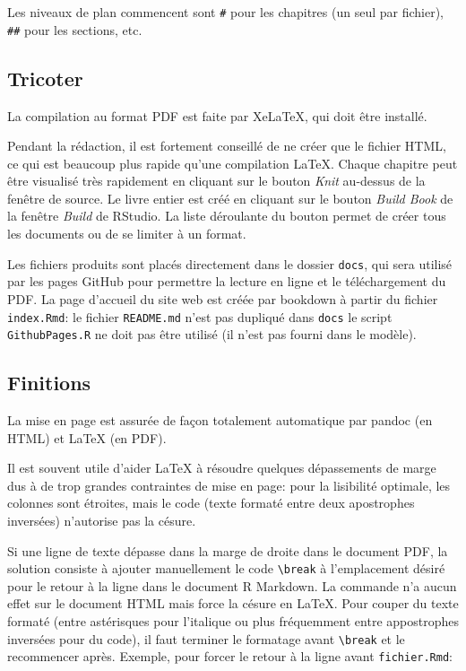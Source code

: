 \documentclass[
  11pt,
  french,
  a4paper,
  extrafontsizes,onecolumn,openright
  ]{memoir}
\begin{document}
Les niveaux de plan commencent sont \texttt{\#} pour les chapitres (un seul par fichier), \texttt{\#\#} pour les sections, etc.

\hypertarget{tricoter-1}{%
\subsection{Tricoter}\label{tricoter-1}}

La compilation au format PDF est faite par XeLaTeX, qui doit être installé.

Pendant la rédaction, il est fortement conseillé de ne créer que le fichier HTML, ce qui est beaucoup plus rapide qu'une compilation LaTeX.
Chaque chapitre peut être visualisé très rapidement en cliquant sur le bouton \emph{Knit} au-dessus de la fenêtre de source.
Le livre entier est créé en cliquant sur le bouton \emph{Build Book} de la fenêtre \emph{Build} de RStudio.
La liste déroulante du bouton permet de créer tous les documents ou de se limiter à un format.

Les fichiers produits sont placés directement dans le dossier \texttt{docs}, qui sera utilisé par les pages GitHub pour permettre la lecture en ligne et le téléchargement du PDF.
La page d'accueil du site web est créée par bookdown à partir du fichier \texttt{index.Rmd}: le fichier \texttt{README.md} n'est pas dupliqué dans \texttt{docs} le script \texttt{GithubPages.R} ne doit pas être utilisé (il n'est pas fourni dans le modèle).

\hypertarget{finitions}{%
\subsection{Finitions}\label{finitions}}

La mise en page est assurée de façon totalement automatique par pandoc (en HTML) et LaTeX (en PDF).

Il est souvent utile d'aider LaTeX à résoudre quelques dépassements de marge dus à de trop grandes contraintes de mise en page: pour la lisibilité optimale, les colonnes sont étroites, mais le code (texte formaté entre deux apostrophes inversées) n'autorise pas la césure.

Si une ligne de texte dépasse dans la marge de droite dans le document PDF, la solution consiste à ajouter manuellement le code \texttt{\textbackslash{}break} à l'emplacement désiré pour le retour à la ligne dans le document R Markdown.
La commande n'a aucun effet sur le document HTML mais force la césure en LaTeX.
Pour couper du texte formaté (entre astérisques pour l'italique ou plus fréquemment entre appostrophes inversées pour du code), il faut terminer le formatage avant \texttt{\textbackslash{}break} et le recommencer après.
Exemple, pour forcer le retour à la ligne avant \texttt{fichier.Rmd}:
\end{document}
